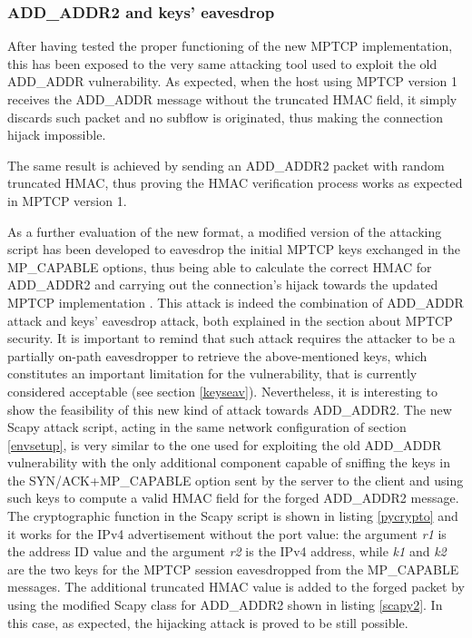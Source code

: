 \subsubsection{ADD\_ADDR2 and keys' eavesdrop}
After having tested the proper functioning of the new MPTCP implementation, this has been exposed to the very same attacking tool used to exploit the old ADD\_ADDR vulnerability. As expected, when the host using MPTCP version 1 receives the ADD\_ADDR message without the truncated HMAC field, it simply discards such packet and no subflow is originated, thus making the connection hijack impossible.

The same result is achieved by sending an ADD\_ADDR2 packet with random truncated HMAC, thus proving the HMAC verification process works as expected in MPTCP version 1.

As a further evaluation of the new format, a modified version of the attacking script has been developed to eavesdrop the initial MPTCP keys exchanged in the MP\_CAPABLE options, thus being able to calculate the correct HMAC for ADD\_ADDR2 and carrying out the connection's hijack towards the updated MPTCP implementation \cite{add-addr2-eav}. This attack is indeed the combination of ADD\_ADDR attack and keys' eavesdrop attack, both explained in the section about MPTCP security.
It is important to remind that such attack requires the attacker to be a partially on-path eavesdropper to retrieve the above-mentioned keys, which constitutes an important limitation for the vulnerability, that is currently considered acceptable (see section \ref{keyseav}). Nevertheless, it is interesting to show the feasibility of this new kind of attack towards ADD\_ADDR2. The new Scapy attack script, acting in the same network configuration of section \ref{envsetup}, is very similar to the one used for exploiting the old ADD\_ADDR vulnerability with the only additional component capable of sniffing the keys in the SYN/ACK+MP\_CAPABLE option sent by the server to the client and using such keys to compute a valid HMAC field for the forged ADD\_ADDR2 message. The cryptographic function in the Scapy script is shown in listing \ref{pycrypto} and it works for the IPv4 advertisement without the port value: the argument \textit{r1} is the address ID value and the argument \textit{r2} is the IPv4 address, while \textit{k1} and \textit{k2} are the two keys for the MPTCP session eavesdropped from the MP\_CAPABLE messages. The additional truncated HMAC value is added to the forged packet by using the modified Scapy class for ADD\_ADDR2 shown in listing \ref{scapy2}. In this case, as expected, the hijacking attack is proved to be still possible.

